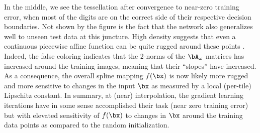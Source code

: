 \documentclass{notices}
\begin{document}
In the middle, we see the tessellation after convergence to near-zero training error, when most of the digits are on the correct side of their respective decision boundaries.
Not shown by the figure is the fact that the network also generalizes well to unseen test data at this juncture.
High density suggests that even a continuous piecewise affine function can be quite rugged around these points \cite{sebastianParis}.
Indeed, the false coloring indicates that the 2-norms of the $\bA_\omega$ matrices has increased around the training images, meaning that their ``slopes'' have increased.
As a consequence, the overall spline mapping $f(\bx)$ is now likely more rugged and more sensitive to changes in the input $\bx$ as measured by a local (per-tile) Lipschitz constant.
In summary, at (near) interpolation, the gradient learning iterations have in some sense accomplished their task (near zero training error) but with elevated sensitivity of $f(\bx)$ to changes in $\bx$ around the training data points as compared to the random initialization.
\end{document}
